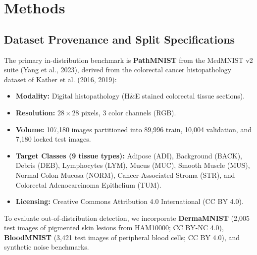 \documentclass[11pt,a4paper]{article}
\begin{document}
\section{Methods}

\subsection{Dataset Provenance and Split Specifications}
The primary in-distribution benchmark is \textbf{PathMNIST} from the MedMNIST v2 suite (Yang et al., 2023), derived from the colorectal cancer histopathology dataset of Kather et al. (2016, 2019):
\begin{itemize}[leftmargin=*]
    \item \textbf{Modality:} Digital histopathology (H\&E stained colorectal tissue sections).
    \item \textbf{Resolution:} $28 \times 28$ pixels, 3 color channels (RGB).
    \item \textbf{Volume:} 107,180 images partitioned into 89,996 train, 10,004 validation, and 7,180 locked test images.
    \item \textbf{Target Classes (9 tissue types):} Adipose (ADI), Background (BACK), Debris (DEB), Lymphocytes (LYM), Mucus (MUC), Smooth Muscle (MUS), Normal Colon Mucosa (NORM), Cancer-Associated Stroma (STR), and Colorectal Adenocarcinoma Epithelium (TUM).
    \item \textbf{Licensing:} Creative Commons Attribution 4.0 International (CC BY 4.0).
\end{itemize}
To evaluate out-of-distribution detection, we incorporate \textbf{DermaMNIST} (2,005 test images of pigmented skin lesions from HAM10000; CC BY-NC 4.0), \textbf{BloodMNIST} (3,421 test images of peripheral blood cells; CC BY 4.0), and synthetic noise benchmarks.
\end{document}
